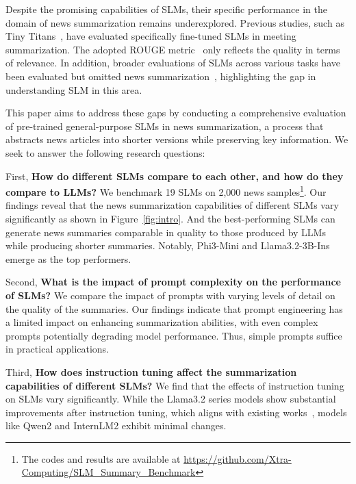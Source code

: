 Despite the promising capabilities of SLMs, their specific performance in the domain of news summarization remains underexplored. Previous studies, such as Tiny Titans~\cite{tiny_titan}, have evaluated specifically fine-tuned SLMs in meeting summarization. The adopted ROUGE metric~\cite{lin-2004-rouge} only reflects the quality in terms of relevance. In addition, broader evaluations of SLMs across various tasks have been evaluated but omitted news summarization~\cite{lu2024smalllanguagemodelssurvey}, highlighting the gap in understanding SLM in this area.

This paper aims to address these gaps by conducting a comprehensive evaluation of pre-trained general-purpose SLMs in news summarization, a process that abstracts news articles into shorter versions while preserving key information. We seek to answer the following research questions:


First, \textbf{How do different SLMs compare to each other, and how do they compare to LLMs?} We benchmark 19 SLMs on 2,000 news samples\footnote{The codes and results are available at \url{https://github.com/Xtra-Computing/SLM_Summary_Benchmark}}. Our findings reveal that the news summarization capabilities of different SLMs vary significantly as shown in Figure~\ref{fig:intro}. And the best-performing SLMs can generate news summaries comparable in quality to those produced by LLMs while producing shorter summaries. Notably, Phi3-Mini and Llama3.2-3B-Ins emerge as the top performers.


Second, \textbf{What is the impact of prompt complexity on the performance of SLMs?} We compare the impact of prompts with varying levels of detail on the quality of the summaries. Our findings indicate that prompt engineering has a limited impact on enhancing summarization abilities, with even complex prompts potentially degrading model performance. Thus, simple prompts suffice in practical applications.

Third, \textbf{How does instruction tuning affect the summarization capabilities of different SLMs?} We find that the effects of instruction tuning on SLMs vary significantly. While the Llama3.2 series models show substantial improvements after instruction tuning, which aligns with existing works~\cite{zhang2024benchmarking}, models like Qwen2 and InternLM2 exhibit minimal changes.





